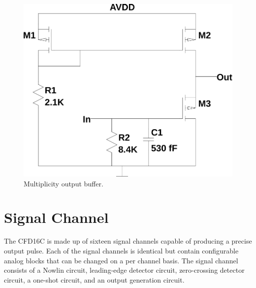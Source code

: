 \documentclass[12pt,oneside,final]{siuethesis}
\theoremstyle{definition}
\begin{document}
\begin{figure}[htbp!]
\centering
\includegraphics[scale=.45,keepaspectratio=true]{../LTspice_Drawings/multiplicity/mult_buffer.png} 
\caption{Multiplicity output buffer.}
\label{fig:mult}
\end{figure}


\section{Signal Channel}
\par The CFD16C is made up of sixteen signal channels capable of producing a precise output pulse. Each of the signal channels is identical but contain configurable analog blocks that can be changed on a per channel basis. The signal channel consists of a Nowlin circuit, leading-edge detector circuit, zero-crossing detector circuit, a one-shot circuit, and an output generation circuit. 
\end{document}
